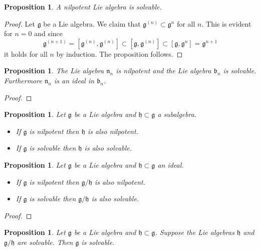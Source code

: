 \documentclass[12pt]{article}
\theoremstyle{plain}
\newtheorem{prop}[thm]{Proposition}
\theoremstyle{definition}
\numberwithin{equation}{section}
\newcommand{\fb}{\mathfrak{b}}
\newcommand{\g}{\mathfrak{g}}
\newcommand{\h}{\mathfrak{h}}
\newcommand{\n}{\mathfrak{n}}
\begin{document}
\begin{prop}
A nilpotent Lie algebra is solvable.
\end{prop}

\begin{proof}
Let $\g$ be a Lie algebra. We claim that $\g^{(n)} \subset \g^n$ for all $n$. This is evident for $n=0$ and since
\[
\g^{(n+1)} = [\g^{(n)}, \g^{(n)}] \subset [\g, \g^{(n)}] \subset [\g, \g^{n}] = \g^{n+1}
\]
it holds for all $n$ by induction. The proposition follows.
\end{proof}

\begin{prop}
The Lie algebra $\n_n$ is nilpotent and the Lie algebra $\fb_n$ is solvable. Furthermore $\n_n$ is an ideal in $\fb_n$.
\end{prop}

\begin{proof}

\end{proof}

\begin{prop}
Let $\g$ be a Lie algebra and $\h \subset \g$ a subalgebra.
\begin{itemize}
\item[(a)] If $\g$ is nilpotent then $\h$ is also nilpotent.

\item[(b)] If $\g$ is solvable then $\h$ is also solvable.
\end{itemize}
\end{prop}

\begin{prop}
Let $\g$ be a Lie algebra and $\h \subset \g$ an ideal.
\begin{itemize}
\item[(a)] If $\g$ is nilpotent then $\g/\h$ is also nilpotent.

\item[(b)] If $\g$ is solvable then $\g/\h$ is also solvable.
\end{itemize}
\end{prop}

\begin{proof}

\end{proof}

\begin{prop}
Let $\g$ be a Lie algebra and $\h \subset \g$. Suppose the Lie algebras $\h$ and $\g/\h$ are solvable. Then $\g$ is solvable.
\end{prop}
\end{document}
